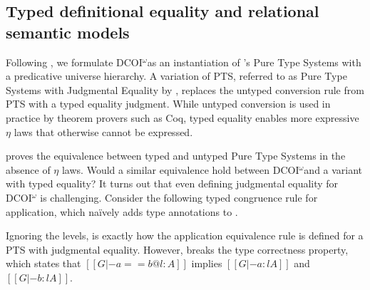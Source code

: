 \documentclass[acmsmall, screen=true, nonacm=true,
  review=\ifpublic false\else true\fi,
  anonymous=\ifanonymous true\else false\fi
]{acmart}
\makeatletter
\DeclarePairedDelimiter{\bracks}{\llbracket}{\rrbracket}
\newcommand{\name}{\texorpdfstring{DCOI$^{\omega}$\@\xspace}{DCOI-omega}}
\newcommand{\interp}[4]{\bracks{#1 \vDash_{#2} #3} \searrow #4}
\newcommand{\member}[3]{#1 \in #3(#2)}
\newcommand{\sws}[3]{#1 \vDash #2 : #3}
\makeatother
\begin{document}

\subsection{Typed definitional equality
  and relational semantic models}

\label{sec:typeddefeq}
Following \citet{liu:dcoi}, we formulate \name as an instantiation of
\citeauthor{barendregt:PTS}'s Pure Type Systems with a predicative
universe hierarchy.
A variation of PTS, referred to as Pure Type Systems with Judgmental
Equality by \citet{adams:pure}, replaces the untyped conversion rule from PTS
with a typed equality judgment. While untyped conversion
is used in practice by theorem provers such as Coq,
typed equality enables more expressive $\eta$ laws
that otherwise cannot be expressed.

\citet{siles:PTS} proves the equivalence between typed and untyped
Pure Type Systems in the absence of $\eta$ laws.
Would a similar equivalence hold between \name and a variant with typed equality?
It turns out that even defining judgmental equality for \name
is challenging. Consider the following
typed congruence rule for application, which na\"ively adds type
annotations to .

{\centering
{}\par
}

Ignoring the levels,  is exactly how the application
equivalence rule is defined for a PTS with judgmental equality. However,
 breaks the
type correctness property, which states that $[[G |- a == b @ l : A]]$
implies $[[G |- a : l A]]$ and $[[G |- b : l A]]$.
\end{document}
